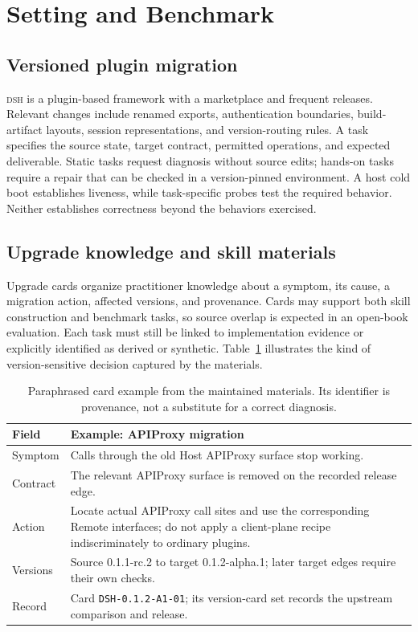 \documentclass[11pt]{article}
\newcommand{\framework}{\textsc{dsh}}
\begin{document}
\section{Setting and Benchmark}
\label{sec:construction}

\subsection{Versioned plugin migration}
\label{sec:scenario}

\framework{} is a plugin-based framework with a marketplace and frequent releases.
Relevant changes include renamed exports, authentication boundaries, build-artifact layouts, session representations, and version-routing rules.
A task specifies the source state, target contract, permitted operations, and expected deliverable.
Static tasks request diagnosis without source edits; hands-on tasks require a repair that can be checked in a version-pinned environment.
A host cold boot establishes liveness, while task-specific probes test the required behavior.
Neither establishes correctness beyond the behaviors exercised.

\subsection{Upgrade knowledge and skill materials}
\label{sec:cards}
\label{sec:corpus}

Upgrade cards organize practitioner knowledge about a symptom, its cause, a migration action, affected versions, and provenance.
Cards may support both skill construction and benchmark tasks, so source overlap is expected in an open-book evaluation.
Each task must still be linked to implementation evidence or explicitly identified as derived or synthetic.
Table~\ref{tab:card} illustrates the kind of version-sensitive decision captured by the materials.

\begin{table}[t]
\centering
\small
\begin{tabular}{>{\raggedright\arraybackslash}p{}>{\raggedright\arraybackslash}p{}}
\hline
Field & Example: APIProxy migration\\
\hline
Symptom & Calls through the old Host APIProxy surface stop working.\\
Contract & The relevant APIProxy surface is removed on the recorded release edge.\\
Action & Locate actual APIProxy call sites and use the corresponding Remote interfaces; do not apply a client-plane recipe indiscriminately to ordinary plugins.\\
Versions & Source 0.1.1-rc.2 to target 0.1.2-alpha.1; later target edges require their own checks.\\
Record & Card \texttt{DSH-0.1.2-A1-01}; its version-card set records the upstream comparison and release.\\
\hline
\end{tabular}
\caption{Paraphrased card example from the maintained materials. Its identifier is provenance, not a substitute for a correct diagnosis.}
\label{tab:card}
\end{table}
\end{document}
